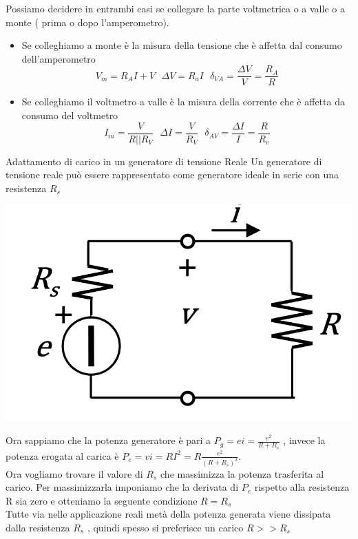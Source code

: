 \documentclass{article}
\theoremstyle{definition}
\begin{document}
\begin{itemize}
\begin{center}
	\end{center}
	Possiamo decidere in entrambi casi se collegare la parte voltmetrica o a valle o a monte ( prima o dopo l'amperometro).
	\begin{itemize}
		\item Se colleghiamo a monte è la misura della tensione che è affetta dal consumo dell'amperometro 
		$$V_m=R_AI+V \ \ \ \Delta V = R_a I \ \ \ \delta_{VA}=\frac{\Delta V}{V}=\frac{R_A}{R}$$
		\item Se colleghiamo il voltmetro a valle è la misura della corrente che è affetta da consumo del voltmetro 
		$$I_m=\frac{V}{R||R_V} \ \ \ \Delta I = \frac{V}{R_V} \ \ \ \delta_{AV}=\frac{\Delta I}{I}=\frac{R}{R_v}$$
	\end{itemize}
	\end{itemize}

\begin{teo*}{Adattamento di carico in un generatore di tensione Reale }
	Un generatore di tensione reale può essere rappresentato come generatore ideale in serie con una resistenza $R_s$  
\begin{center}
	\includegraphics[scale=0.25]{immagini/real}
\end{center}
Ora sappiamo che la potenza generatore è pari a $P_g=ei=\frac{e^2}{R+R_s}$ , invece la potenza erogata al carica è $P_e=vi=RI^2=R\frac{e^2}{(R+R_s)^2}$.\\ Ora vogliamo trovare il valore di $R_s$ che massimizza la potenza trasferita al carico. Per massimizzarla imponiamo che la derivata di $P_e$ rispetto alla resistenza R sia zero e otteniamo la seguente condizione $R=R_s$\\
Tutte via nelle applicazione reali metà della potenza generata viene dissipata dalla resistenza $R_s$ , quindi spesso si preferisce un carico $R>>R_s$
\end{teo*}
\end{document}
